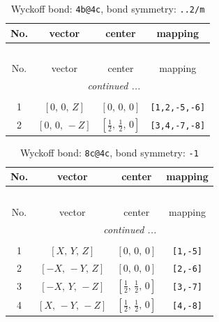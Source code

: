 \documentclass[fleqn,8pt]{jsarticle}
\begin{document}
\renewcommand{\arraystretch}{1.2}
\begin{longtable}{cccc}
\caption{Wyckoff bond: {\tt 4b@4c}, bond symmetry: {\tt ..2/m}}
 \\
 \hline \hline
No. & vector & center & mapping \\ \hline \endfirsthead

\multicolumn{3}{l}{\tablename\ \thetable{}} \\
 \hline \hline
No. & vector & center & mapping \\ \hline \endhead

 \hline \hline
\multicolumn{3}{r}{\footnotesize\it continued ...} \\ \endfoot

 \hline \hline
\multicolumn{3}{r}{} \\ \endlastfoot

1 & $\left[ 0,\, 0,\, Z \right]$ & $\left[ 0,\, 0,\, 0 \right]$ & {\tt [1,2,-5,-6]} \\ \hline
2 & $\left[ 0,\, 0,\, - Z \right]$ & $\left[ \frac{1}{2},\, \frac{1}{2},\, 0 \right]$ & {\tt [3,4,-7,-8]} \\
\end{longtable}
\renewcommand{\arraystretch}{1.2}
\begin{longtable}{cccc}
\caption{Wyckoff bond: {\tt 8c@4c}, bond symmetry: {\tt -1}}
 \\
 \hline \hline
No. & vector & center & mapping \\ \hline \endfirsthead

\multicolumn{3}{l}{\tablename\ \thetable{}} \\
 \hline \hline
No. & vector & center & mapping \\ \hline \endhead

 \hline \hline
\multicolumn{3}{r}{\footnotesize\it continued ...} \\ \endfoot

 \hline \hline
\multicolumn{3}{r}{} \\ \endlastfoot

1 & $\left[ X,\, Y,\, Z \right]$ & $\left[ 0,\, 0,\, 0 \right]$ & {\tt [1,-5]} \\ \hline
2 & $\left[ - X,\, - Y,\, Z \right]$ & $\left[ 0,\, 0,\, 0 \right]$ & {\tt [2,-6]} \\ \hline
3 & $\left[ - X,\, Y,\, - Z \right]$ & $\left[ \frac{1}{2},\, \frac{1}{2},\, 0 \right]$ & {\tt [3,-7]} \\ \hline
4 & $\left[ X,\, - Y,\, - Z \right]$ & $\left[ \frac{1}{2},\, \frac{1}{2},\, 0 \right]$ & {\tt [4,-8]} \\
\end{longtable}
\end{document}
